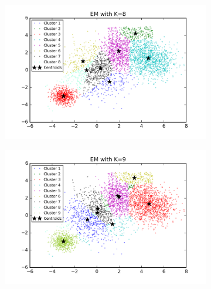 \begin{figure}[htb]
\begin{subfigure}[b]{0.475\textwidth}
        \end{subfigure}
        \hfill
        \begin{subfigure}[b]{0.475\textwidth}  
            \centering 
            \includegraphics[width=\textwidth]{./figures/bigClustering_EM_8.png}
        \end{subfigure}
        \begin{subfigure}[b]{0.475\textwidth}   
            \centering 
            \includegraphics[width=\textwidth]{./figures/bigClustering_EM_9.png}
        \end{subfigure}
        \hfill
        \begin{subfigure}[b]{0.475\textwidth}   
            \centering 

\end{subfigure}
\end{figure}
